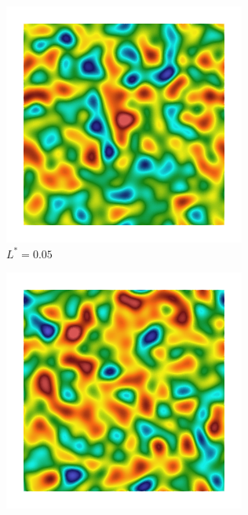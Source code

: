 \begin{figure}[!htbp]
  \begin{subfigure}[b]{0.15\textwidth}
    \includegraphics[width=\textwidth]{Chapter4/figures/2D/Gc_sqexp_cartesian_5_5_rho_0_seed_a.png}
    \caption{$L^* = 0.05$}
    \label{fig: Chapter4/2D/Gc_sqexp_cartesian_5_5_rho_0_seed_a}
  \end{subfigure}
  \begin{subfigure}[b]{0.15\textwidth}
    \includegraphics[width=\textwidth]{Chapter4/figures/2D/psic_sqexp_cartesian_5_5_rho_0_seed_a.png}

\end{subfigure}
\end{figure}

